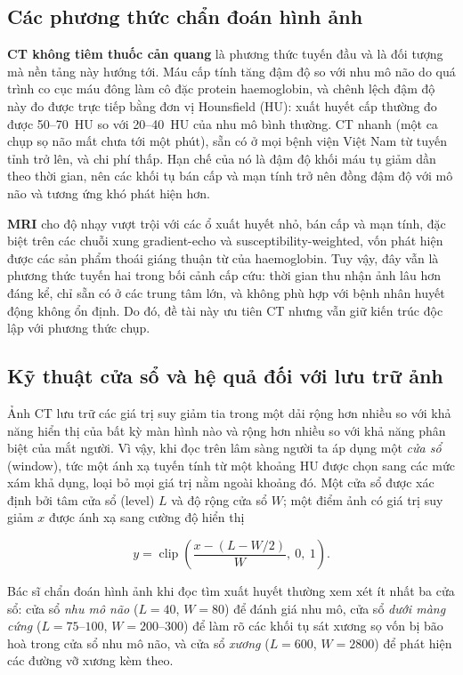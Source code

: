 \subsection{Các phương thức chẩn đoán hình ảnh}

\textbf{CT không tiêm thuốc cản quang} là phương thức tuyến đầu \cite{greenberg2022guideline} và là đối tượng
mà nền tảng này hướng tới. Máu cấp tính tăng đậm độ so với nhu mô não do quá
trình co cục máu đông làm cô đặc protein haemoglobin, và chênh lệch đậm độ này
đo được trực tiếp bằng đơn vị Hounsfield (HU): xuất huyết cấp thường đo được
50--70~HU so với 20--40~HU của nhu mô bình thường. CT nhanh (một ca chụp sọ não
mất chưa tới một phút), sẵn có ở mọi bệnh viện Việt Nam từ tuyến tỉnh trở lên,
và chi phí thấp. Hạn chế của nó là đậm độ khối máu tụ giảm dần theo thời gian,
nên các khối tụ bán cấp và mạn tính trở nên đồng đậm độ với mô não và tương ứng
khó phát hiện hơn.

\textbf{MRI} cho độ nhạy vượt trội với các ổ xuất huyết nhỏ, bán cấp và mạn
tính, đặc biệt trên các chuỗi xung gradient-echo và susceptibility-weighted,
vốn phát hiện được các sản phẩm thoái giáng thuận từ của haemoglobin. Tuy vậy,
đây vẫn là phương thức tuyến hai trong bối cảnh cấp cứu: thời gian thu nhận ảnh
lâu hơn đáng kể, chỉ sẵn có ở các trung tâm lớn, và không phù hợp với bệnh nhân
huyết động không ổn định. Do đó, đề tài này ưu tiên CT nhưng vẫn giữ kiến trúc
độc lập với phương thức chụp.

\subsection{Kỹ thuật cửa sổ và hệ quả đối với lưu trữ ảnh}
\label{sec:windowing}

Ảnh CT lưu trữ các giá trị suy giảm tia trong một dải rộng hơn nhiều so với khả
năng hiển thị của bất kỳ màn hình nào và rộng hơn nhiều so với khả năng phân
biệt của mắt người. Vì vậy, khi đọc trên lâm sàng người ta áp dụng một
\emph{cửa sổ} (window), tức một ánh xạ tuyến tính từ một khoảng HU được chọn
sang các mức xám khả dụng, loại bỏ mọi giá trị nằm ngoài khoảng đó. Một cửa sổ
được xác định bởi tâm cửa sổ (level) $L$ và độ rộng cửa sổ $W$; một điểm ảnh có
giá trị suy giảm $x$ được ánh xạ sang cường độ hiển thị

\begin{equation}
    y = \operatorname{clip}\!\left(\frac{x - (L - W/2)}{W},\ 0,\ 1\right).
\end{equation}

Bác sĩ chẩn đoán hình ảnh khi đọc tìm xuất huyết thường xem xét ít nhất ba cửa
sổ: cửa sổ \emph{nhu mô não} ($L=40$, $W=80$) để đánh giá nhu mô, cửa sổ
\emph{dưới màng cứng} ($L=75$--$100$, $W=200$--$300$) để làm rõ các khối tụ sát
xương sọ vốn bị bão hoà trong cửa sổ nhu mô não, và cửa sổ \emph{xương}
($L=600$, $W=2800$) để phát hiện các đường vỡ xương kèm theo.

